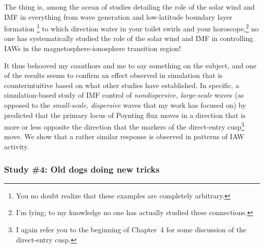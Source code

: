 

The thing is, among the ocean of studies detailing the role of the solar wind
and IMF in everything from wave generation \citep[][for
example]{Claudepierre2008} and low-latitude boundary layer formation
\citep{Song2003a}\footnote{You no doubt realize that these examples are
  completely arbitrary.}  to which direction water in your toilet swirls and
your horoscope,\footnote{I'm lying; to my knowledge no one has actually studied
  these connections.} no one has systematically studied the role of the solar
wind and IMF in controlling IAWs in the magnetosphere-ionosphere transition
region! 

It thus behooved my coauthors and me to say something on the subject, and one of
the results seems to confirm an effect observed in simulation that is
counterintuitive based on what other studies have established. In specific, a
simulation-based study of IMF control of \emph{nondispersive, large-scale} \Alf
waves (as opposed to the \emph{small-scale, dispersive} \Alf waves that my work
has focused on) by \citet{Zhang2014} predicted that the primary locus of \Alfic
Poynting flux moves in a direction that is more or less opposite the direction
that the markers of the direct-entry cusp\footnote{I again refer you to the
  beginning of Chapter~4 for some discussion of the direct-entry cusp.} move. We
show that a rather similar response is observed in patterns of IAW activity.

\subsubsection{Study \#4: Old dogs doing new tricks}

